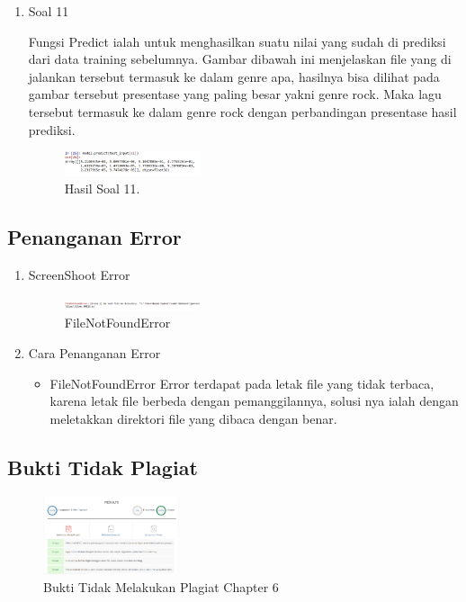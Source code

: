 \begin{enumerate}
	\item Soal 11
	\hfill\break
	
	Fungsi Predict ialah untuk menghasilkan suatu nilai yang sudah di prediksi dari data training sebelumnya. Gambar dibawah ini menjelaskan file yang di jalankan tersebut termasuk ke dalam genre apa, hasilnya bisa dilihat pada gambar tersebut presentase yang paling besar yakni genre rock. Maka lagu tersebut termasuk ke dalam genre rock dengan perbandingan presentase hasil prediksi.
	\begin{figure}[H]
	\centering
		\includegraphics[width=4cm]{figures/1174087/6/20.png}
		\caption{Hasil Soal 11.}
	\end{figure}
\end{enumerate}

\subsection{Penanganan Error}
\begin{enumerate}
	\item ScreenShoot Error
	\begin{figure}[H]
		\includegraphics[width=4cm]{figures/1174087/6/error.png}
		\centering
		\caption{FileNotFoundError}
	\end{figure}

	\item Cara Penanganan Error
	\begin{itemize}
		\item FileNotFoundError
		\hfill\break
		Error terdapat pada letak file yang tidak terbaca, karena letak file berbeda dengan pemanggilannya, solusi nya ialah dengan meletakkan direktori file yang dibaca dengan benar.
	\end{itemize}
\end{enumerate}

\subsection{Bukti Tidak Plagiat}
\begin{figure}[H]
\centering
	\includegraphics[width=4cm]{figures/1174087/6/plagiat.png}
	\caption{Bukti Tidak Melakukan Plagiat Chapter 6}
\end{figure}